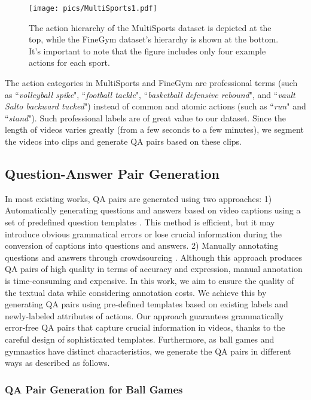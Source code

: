 {\begin{figure}[tbp]
\centering
\texttt{[image: pics/MultiSports1.pdf]}
\caption{The action hierarchy of the MultiSports dataset is depicted at the top, while the FineGym dataset's hierarchy is shown at the bottom. It's important to note that the figure includes only four example actions for each sport.}
\label{ms}
\end{figure}

The action categories in MultiSports and FineGym are professional terms (such as ``\textit{volleyball spike}", ``\textit{football tackle}", ``\textit{basketball defensive rebound}", and ``\textit{vault Salto backward tucked}") instead of common and atomic actions (such as ``\textit{run}" and ``\textit{stand}"). Such professional labels are of great value to our dataset.
Since the length of videos varies greatly (from a few seconds to a few minutes), we segment the videos into clips and generate QA pairs based on these clips.

\subsection{Question-Answer Pair Generation}

In most existing works, QA pairs are generated using two approaches:
1) Automatically generating questions and answers based on video captions using a set of predefined question templates \citep{jang2017tgif, xu2017video, yang2021just}. This method is efficient, but it may introduce obvious grammatical errors or lose crucial information during the conversion of captions into questions and answers.
2) Manually annotating questions and answers through crowdsourcing \citep{xiao2021next, yu2019activitynet, garcia2020knowit}. Although this approach produces QA pairs of high quality in terms of accuracy and expression, manual annotation is time-consuming and expensive.
In this work, we aim to ensure the quality of the textual data while considering annotation costs. We achieve this by generating QA pairs using pre-defined templates based on existing labels and newly-labeled attributes of actions. Our approach guarantees grammatically error-free QA pairs that capture crucial information in videos, thanks to the careful design of sophisticated templates. Furthermore, as ball games and gymnastics have distinct characteristics, we generate the QA pairs in different ways as described as follows.

\subsubsection{QA Pair Generation for Ball Games}

}
